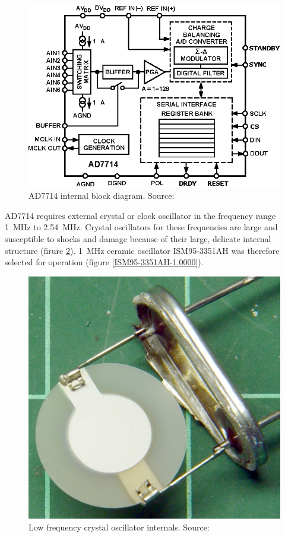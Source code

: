         \begin{figure}[H]
            \centering
            \includegraphics[width=0.5\paperwidth]{img/06/AD7714.eps}
            \caption{AD7714 internal block diagram. Source: \cite{AD7714_datasheet}}
            \label{AD7714}
        \end{figure}

        AD7714 requires external crystal or clock oscillator in the frequency range \SI{1}{\mega\hertz} to \SI{2.54}{\mega\hertz}. Crystal oscillators for these frequencies are large and susceptible to shocks and damage because of their large, delicate internal structure (firure \ref{Opening_a_Quartz_Crystal_Can_Effects_Thereof}). \SI{1}{\mega\hertz} ceramic oscillator ISM95-3351AH was therefore selected for operation (figure \ref{ISM95-3351AH-1.0000}).

        \begin{figure}[H]
            \centering
            \includegraphics[width=0.5\paperwidth]{img/06/crystal.png}
            \caption{Low frequency crystal oscillator internals. Source: \cite{Opening_a_Quartz_Crystal_Can_Effects_Thereof}}
            \label{Opening_a_Quartz_Crystal_Can_Effects_Thereof}
        \end{figure}

